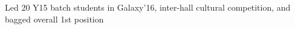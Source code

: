 \begin{cventries}
{\begin{cvitems}
       \item {Led 20 Y15 batch students in Galaxy’16, inter-hall cultural competition, and bagged overall 1st position}
      \end{cvitems}
    }
\end{cventries}
